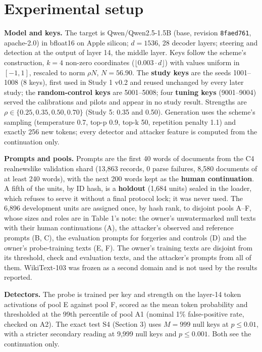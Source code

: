 \documentclass[11pt,letterpaper]{article}
\begin{document}
\hypertarget{experimental-setup}{%
\section{Experimental setup}\label{experimental-setup}}

\textbf{Model and keys.} The target is Qwen/Qwen2.5-1.5B (base, revision \texttt{8fae\allowbreak{}d761}, apache-2.0) \citep{qwen2024qwen25, qwen2024card15b} in bfloat16 on Apple silicon; \(d = 1536\), 28 decoder layers; steering and detection at the output of layer 14, the middle layer. Keys follow the scheme's construction, \(k = 4\) non-zero coordinates (\(\lfloor 0.003 \cdot d \rfloor\)) with values uniform in \([-1, 1]\), rescaled to norm \(\rho N\), \(N = 56.90\). The \textbf{study keys} are the seeds 1001--1008 (8 keys), first used in Study 1 v0.2 and reused unchanged by every later study; the \textbf{random-control keys} are 5001--5008; four \textbf{tuning keys} (9001--9004) served the calibrations and pilots and appear in no study result. Strengths are \(\rho \in \{0.25, 0.35, 0.50, 0.70\}\) (Study 5: 0.35 and 0.50). Generation uses the scheme's sampling (temperature 0.7, top-p 0.9, top-k 50, repetition penalty 1.1) and exactly 256 new tokens; every detector and attacker feature is computed from the continuation only.

\textbf{Prompts and pools.} Prompts are the first 40 words of documents from the C4 realnewslike validation shard \citep{raffel2020t5} (13,863 records, 0 parse failures, 8,580 documents of at least 240 words), with the next 200 words kept as the \textbf{human continuation}. A fifth of the units, by ID hash, is a \textbf{holdout} (1,684 units) sealed in the loader, which refuses to serve it without a final protocol lock; it was never used. The 6,896 development units are assigned once, by hash rank, to disjoint pools A--F, whose sizes and roles are in Table 1's note: the owner's unwatermarked null texts with their human continuations (A), the attacker's observed and reference prompts (B, C), the evaluation prompts for forgeries and controls (D) and the owner's probe-training texts (E, F). The owner's training texts are disjoint from its threshold, check and evaluation texts, and the attacker's prompts from all of them. WikiText-103 \citep{merity2017pointer} was frozen as a second domain and is not used by the results reported.

\textbf{Detectors.} The probe is trained per key and strength on the layer-14 token activations of pool E against pool F, scored as the mean token probability and thresholded at the 99th percentile of pool A1 (nominal 1\% false-positive rate, checked on A2). The exact test S4 (Section 3) uses \(M = 999\) null keys at \(p \leq 0.01\), with a stricter secondary reading at 9,999 null keys and \(p \leq 0.001\). Both see the continuation only.
\end{document}
